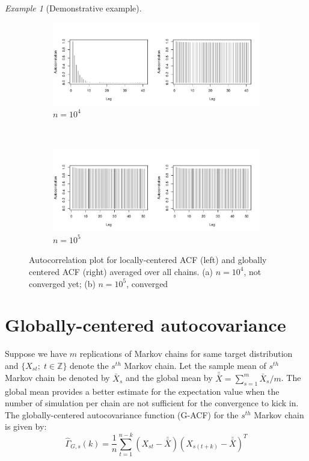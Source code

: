 \documentclass[11pt]{article}
\theoremstyle{remark}
\newtheorem{example}{Example}
\begin{document}
\begin{example}[Demonstrative example]
\begin{figure}[htbp]
\begin{subfigure}{\textwidth}
   \centering
   \includegraphics[width=.9\linewidth]{plots/gaussian-acf_n1e4.pdf}
   \caption{$n = 10^4$}
   \label{subfig:gauss-acf-1e4}
 \end{subfigure}\\
 \begin{subfigure}{\textwidth}
   \centering
   \includegraphics[width=.9\linewidth]{plots/gaussian-acf_n1e5.pdf} 
   \caption{$n = 10^5$}
   \label{subfig:gauss-acf-1e5}
 \end{subfigure}
 \caption{Autocorrelation plot for locally-centered ACF (left) and globally centered ACF (right) averaged over all chains. (a) $n = 10^4$, not converged yet; (b) $n =  10^5$, converged}
 \label{fig:gauss:acf}
\end{figure}
\end{example}



\section{Globally-centered autocovariance} \label{sec:G-ACF}

 Suppose we have $m$ replications of Markov chains for same target distribution and $\{X_{st}; \; t \in \mathbb{Z}\}$ denote the $s^{th}$ Markov chain. Let the sample mean of $s^{th}$ Markov chain be denoted by $\bar{X}_s$ and the global mean by $\bar{\bar{X}} = \sum_{s = 1}^{m}\bar{X}_s/m$. The global mean provides a better estimate for the expectation value when the number of simulation per chain are not sufficient for the convergence to kick in. The globally-centered autocovariance function (G-ACF) for the $s^{th}$ Markov chain is given by:
%
\[
\hat{\Gamma}_{G,s}(k) = \dfrac{1}{n} \sum_{t=1}^{n-k}(X_{st}-\bar{\bar{X}})(X_{s(t+k)}-\bar{\bar{X}})^T
\]
\end{document}
